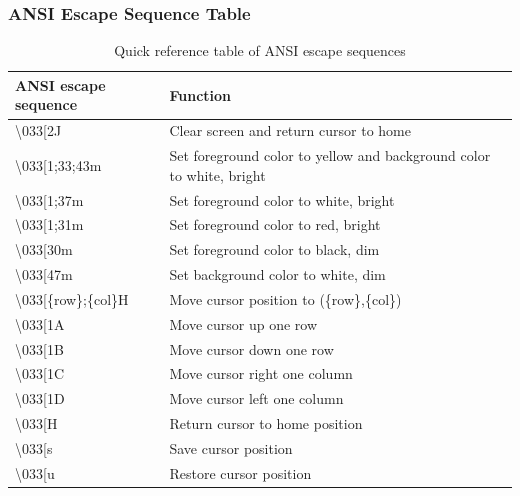 \documentclass[12pt]{article}
\begin{document}
\subsubsection{ANSI Escape Sequence Table}
\begin{table}[h]
	\centering
	\begin{tabular}{|l|l|}
		\hline
		ANSI escape sequence & Function \\ \hline
		\textbackslash033[2J & Clear screen and return cursor to home \\ \hline
		\textbackslash033[1;33;43m & Set foreground color to yellow and background color to white, bright \\ \hline
		\textbackslash033[1;37m & Set foreground color to white, bright\\ \hline
		\textbackslash033[1;31m & Set foreground color to red, bright\\ \hline
		\textbackslash033[30m & Set foreground color to black, dim\\ \hline
		\textbackslash033[47m & Set background color to white, dim\\ \hline
		\textbackslash033[\{row\};\{col\}H & Move cursor position to (\{row\},\{col\})\\ \hline
		\textbackslash033[1A & Move cursor up one row \\ \hline
		\textbackslash033[1B & Move cursor down one row \\ \hline
		\textbackslash033[1C & Move cursor right one column \\ \hline
		\textbackslash033[1D & Move cursor left one column \\ \hline
		\textbackslash033[H & Return cursor to home position\\ \hline
		\textbackslash033[s & Save cursor position\\ \hline
		\textbackslash033[u & Restore cursor position\\ \hline
		
	\end{tabular}
	\caption{Quick reference table of ANSI escape sequences}
	\label{ANSI}
\end{table}
\end{document}
